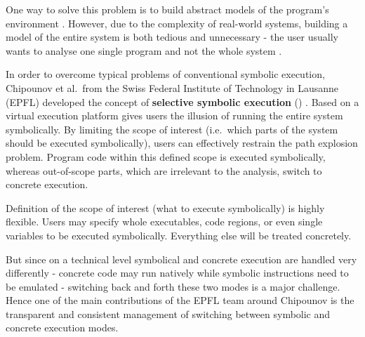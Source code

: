 One way to solve this problem is to build abstract models of the program's environment .
However, due to the complexity of real-world systems, building a model of the entire system is both tedious and unnecessary - the user usually wants to analyse one single program and not the whole system \cite{chip09sel}.

\bigskip

In order to overcome typical problems of conventional symbolic execution, Chipounov et al.~from the Swiss Federal Institute of Technology in Lausanne (EPFL) developed the concept of \textbf{selective symbolic execution} (\sse) \cite{chip09sel}.
Based on a virtual execution platform \sse gives users the illusion of running the entire system symbolically.
By limiting the scope of interest (i.e.~which parts of the system should be executed symbolically), users can effectively restrain the path explosion problem.
Program code within this defined scope is executed symbolically, whereas out-of-scope parts, which are irrelevant to the analysis, switch to concrete execution.


Definition of the scope of interest (what to execute symbolically) is highly flexible.
Users may specify whole executables, code regions, or even single variables to be executed symbolically. Everything else will be treated concretely.

But since on a technical level symbolical and concrete execution are handled very differently - concrete code may run natively while symbolic instructions need to be emulated - switching back and forth these two modes is a major challenge.
Hence one of the main contributions of the EPFL team around Chipounov is the transparent and consistent management of switching between symbolic and concrete execution modes.







\iffalse
§2	Selective Symbolic Execution
		> Theorie-Teil
		> Was ist Symbolic Execution?
		> Was kann Selective Symbolic Execution besser?
			(Concrete -> symbolic transition usw.)
		> Konsistenzmodelle (wird hier evtl. schwierig, das richtige Maß 
			zu finden, um die Sache auf wenig Platz zu verstehen)
\fi
